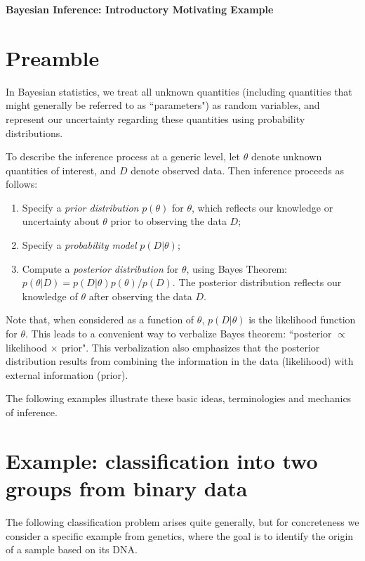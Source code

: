 \documentclass[times,11pt]{article}
\begin{document}

\begin{center}
\Large\bf Bayesian Inference: Introductory Motivating Example
\end{center}
\normalsize

\section*{Preamble}

In Bayesian statistics, we treat all unknown quantities (including quantities that might generally be referred to as ``parameters")
as random variables, and represent our uncertainty regarding these quantities using probability distributions. 

To describe the inference process at a generic level, let $\theta$ denote unknown quantities of interest, and $D$ denote observed data. Then inference proceeds as follows:
\begin{enumerate}
\item Specify a {\it prior distribution} $p(\theta)$ for $\theta$, which reflects our knowledge or uncertainty about
$\theta$ prior to observing the data $D$;
\item Specify a {\it probability model} $p(D|\theta)$; 
\item Compute a {\it posterior distribution} for $\theta$, using Bayes Theorem: $p(\theta |D) = p(D|\theta) p(\theta)/p(D)$. The posterior distribution reflects our knowledge of $\theta$ after observing the data $D$.
\end{enumerate}

Note that, when considered as a function of $\theta$, $p(D|\theta)$ is the likelihood function for $\theta$. This leads to a convenient way to verbalize Bayes theorem:  ``posterior $\propto$ likelihood $\times$ prior". This verbalization also emphasizes that the posterior distribution results from combining the information in the data (likelihood) with external information (prior).

The following examples illustrate these basic ideas, terminologies and mechanics of inference.

\section*{Example: classification into two groups from binary data}

The following classification problem arises quite generally, but for concreteness we consider a 
specific example from genetics, where
the goal is to identify the origin of a sample based on its DNA.
\end{document}
